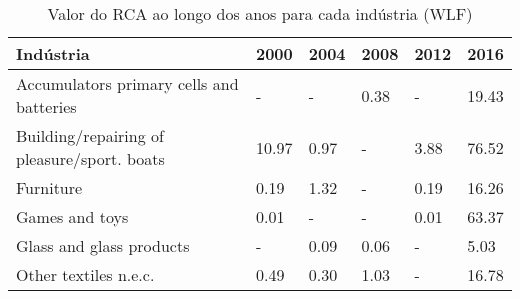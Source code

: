 \begin{table}
\centering
\caption{Valor do RCA ao longo dos anos para cada indústria (WLF)}
\label{tab:ex3-tempo-WLF}
\begin{tabular}{p{6cm}p{1.5cm}p{1.5cm}p{1.5cm}p{1.5cm}p{1.5cm}}
\toprule
                                  Indústria &  2000 & 2004 & 2008 & 2012 &  2016 \\
\midrule
   Accumulators primary cells and batteries &     - &    - & 0.38 &    - & 19.43 \\
Building/repairing of pleasure/sport. boats & 10.97 & 0.97 &    - & 3.88 & 76.52 \\
                                  Furniture &  0.19 & 1.32 &    - & 0.19 & 16.26 \\
                             Games and toys &  0.01 &    - &    - & 0.01 & 63.37 \\
                   Glass and glass products &     - & 0.09 & 0.06 &    - &  5.03 \\
                      Other textiles n.e.c. &  0.49 & 0.30 & 1.03 &    - & 16.78 \\
\bottomrule
\end{tabular}
\end{table}
